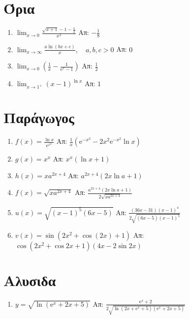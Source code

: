 


\geometry{top=1.5cm}
\everymath{\displaystyle}
\pagestyle{vangelis}



\begin{center}
  \minibox{\bfseries\large \textcolor{Col1}{Ασκήσεις στις Παραγώγους}}
\end{center}

\vspace{\baselineskip}

\section{Όρια}

\begin{enumerate}
  \item $ \lim_{x \to 0} \frac{\sqrt{x+1} -1 - \frac{x}{2}}{x^{2}} $ 
    \hfill Απ: $ -\frac{1}{8} $ 
  \item $ \lim_{x \to \infty} \frac{a \ln{(bx+c)}}{x}, \quad a,b,c > 0 $ 
    \hfill Απ: $ 0 $ 
  \item $ \lim_{x \to 0} \left(\frac{1}{x} - \frac{1}{\mathrm{e}^{x} -1}\right) $ 
    \hfill Απ: $ \frac{1}{2} $
  \item $ \lim_{x \to 1^{+}} (x-1)^{\ln{x}} $ \hfill Απ: $ 1 $ 
\end{enumerate}

\section{Παράγωγος}

\begin{enumerate}
  \item $ f(x) = \frac{\ln{x}}{\mathrm{e}^{x^{2}}} $ \hfill Απ: $ \frac{1}{x}
    (\mathrm{e}^{-x^{2}} - 2x^{2} \mathrm{e}^{-x^{2}} \ln{x}) $ 
  \item $ g(x) = x^{x} $ \hfill Απ: $ x^{x}(\ln{x} + 1) $  
  \item $ h(x) = xa^{2x+4} $ \hfill Απ: $ a^{2x+4}(2x \ln{a} + 1) $ 
  \item $ f(x) = \sqrt{xa^{2x+4}}$ 
    \hfill Απ: $ \frac{a^{2x+4}(2x \ln{a} + 1)}{2 \sqrt{xa^{2x+4}}} $ 
  \item $ u(x) = \sqrt{(x-1)^{5}(6x-5)} $ 
    \hfill Απ: $ \frac{(36x-31)(x-1)^{4}}{2 \sqrt{(6x-5)(x-1)^{5}}} $ 
  \item $ v(x) = \sin{(2x^{2}+ \cos(2x)+1)} $ 
    \hfill Απ: $ \cos{(2x^{2} + \cos{2x} +1)} (4x - 2 \sin{2x}) $ 
\end{enumerate}

\section{Αλυσιδα}

\begin{enumerate}
  \item $ y = \sqrt{\ln{(\mathrm{e}^{x} + 2x + 5)}} $ 
    \hfill Απ: $ \frac{\mathrm{e}^{x} + 2}{2 \sqrt{\ln{(2x+ \mathrm{e}^{x} + 5) 
    (\mathrm{e}^{x} + 2x+5)}}} $
\end{enumerate}



